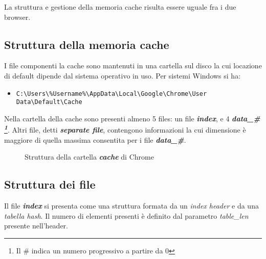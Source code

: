 La struttura e gestione della memoria cache risulta essere uguale fra i due browser.

\subsection{Struttura della memoria cache}

I file componenti la cache sono mantenuti in una cartella sul disco la cui locazione di default dipende dal sistema operativo in uso. Per sistemi Windows si ha: 

\begin{itemize}
	\item{\texttt{C:\textbackslash Users\textbackslash\%Username\%\textbackslash AppData\textbackslash Local\textbackslash Google\textbackslash Chrome\textbackslash User Data\textbackslash Default\textbackslash Cache}}
\end{itemize}

Nella cartella della cache sono presenti almeno 5 files: un file \textbf{\textit{index}}, e 4 \textbf{\textit{data\_\# \footnote{Il \# indica un numero progressivo a partire da 0}}}. Altri file, detti \textbf{\textit{separate file}}, contengono informazioni la cui dimensione è maggiore di quella massima consentita per i file \textbf{\textit{data\_\#}}.

\begin{figure}[h]
	\centering
	\begin{minipage}[c]{0.6\textwidth}
	\end{minipage}
	\caption{Struttura della cartella \textbf{\textit{cache}} di Chrome}
\end{figure}

\subsection{Struttura dei file}
Il file \textbf{\textit{index}} si presenta come una struttura formata da un \textit{index header} e da una \textit{tabella hash}. Il numero di elementi presenti è definito dal parametro \textit{table\_len} presente nell'header. 

